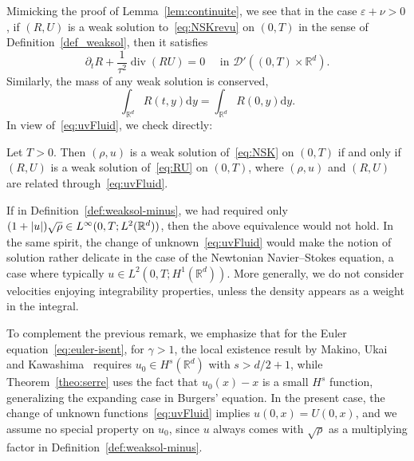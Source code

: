 \documentclass[AHL,Unicode,longabstracts]{cedram}
\DeclareMathOperator{\DIV}{div}
\newcommand*\R{\mathbb{R}}
\newcommand*\dd {\mathrm{d}}
\newcommand*\<{\left\langle}
\renewcommand*\>{\right\rangle}
\newcommand*\eps{\varepsilon}
\begin{document}
Mimicking the proof of Lemma~\ref{lem:continuite}, we see that in the case $\eps + \nu >0$, if $(R,U)$ is a weak solution to~\eqref{eq:NSKrevu} on $(0,T)$ in the sense of Definition~\ref{def_weaksol}, then it satisfies
\[
\partial_t R +\frac{1}{\tau^2} \DIV(R U) = 0 \quad \text{ in \ $\mathcal D'((0,T) \times \mathbb R^d).$}
\]
Similarly, the mass of any weak solution is conserved,
\begin{equation*}
\int_{\R^d} R(t,y)\dd y = \int_{\R^d} R(0,y)\dd y.
\end{equation*}
In view of~\eqref{eq:uvFluid}, we check directly:

\begin{lemm}\label{lem:equivalence}
Let $T>0$. Then $(\rho,u)$ is a weak solution of~\eqref{eq:NSK} on $(0,T)$ if and only if $(R,U)$ is a weak solution of~\eqref{eq:RU} on $(0,T)$, where $(\rho,u)$ and $(R,U)$ are related through~\eqref{eq:uvFluid}.
\end{lemm}

\begin{rema}
If in Definition~\ref{def:weaksol-minus}, we had required only $(1+|u|)\sqrt\rho\in\linebreak L^\infty(0,T; L^2(\R^d))$, then the above equivalence would not hold. In the same spirit, the change of unknown~\eqref{eq:uvFluid} would make the notion of solution rather delicate in the case of the Newtonian Navier--Stokes equation, a case where typically $u\in L^2(0,T; H^1(\R^d))$. More generally, we do not consider velocities enjoying integrability properties, unless the density appears as a weight in the integral.
\end{rema}

\begin{rema}
To complement the previous remark, we emphasize that for the Euler equation~\eqref{eq:euler-isent}, for $\gamma>1$, the local existence result by Makino, Ukai and Kawashima~\cite{MUK86} requires $u_0\in H^s(\R^d)$ with $s>d/2+1$, while Theorem~\ref{theo:serre} uses the fact that $u_0(x)-x$ is a small $H^s$ function, generalizing the expanding case in Burgers' equation. In the present case, the change of unknown functions~\eqref{eq:uvFluid} implies $u(0,x)=U(0,x)$, and we assume no special property on $u_0$, since $u$ always comes with $\sqrt{\rho}$ as a multiplying factor in Definition~\ref{def:weaksol-minus}.
\end{rema}
\end{document}
